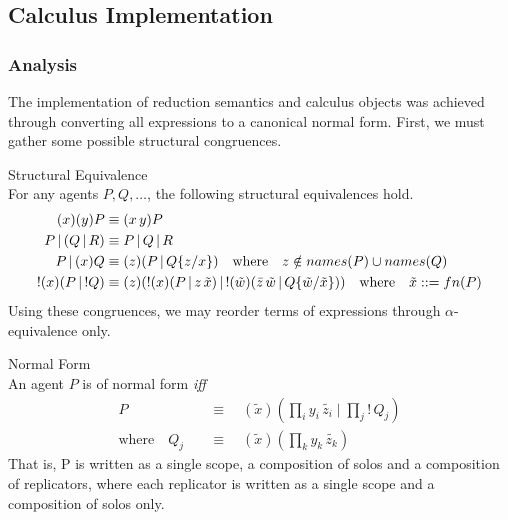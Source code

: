 \subsection{Calculus Implementation}\label{ssec:calculus-implementation}
    
    \subsubsection{Analysis}\label{sssec:calculus-analysis}
        The implementation of reduction semantics and calculus objects was achieved through converting all expressions to a canonical normal form.
        First, we must gather some possible structural congruences.

        \begin{lemma}{Structural Equivalence\\}
            For any agents $P, Q, \ldots$, the following structural equivalences hold.
            \begin{align*}
                (x)(y) P                & \equiv (x \, y) P \\
                P \, | \, (Q \, | \, R) & \equiv P \, | \, Q \, | \, R \\
                P \, | \, (x) Q         & \equiv (z)(P \, | \, Q\{z / x\}) \quad \text{where} \quad z \notin names(P) \cup names(Q) \\
                !(x)(P \, | \, !Q)      & \equiv (z)(!(x)(P \, | \, z \, \tilde{x}) \, | \, !(\tilde{w})(\bar{z} \, \tilde{w} \, | \, Q\{\tilde{w}/\tilde{x}\})) \quad \text{where} \quad \tilde{x} ::= fn(P)
            \end{align*}
            Using these congruences, we may reorder terms of expressions through $\alpha$-equivalence only.
        \end{lemma}

        \begin{definition}{Normal Form\\}
            An agent $P$ is of normal form \textit{iff}
            \begin{align*}
                                    P \quad &\equiv \quad (\tilde{x})(\prod_{i}{y_i \, \tilde{z_i}} \; | \; \prod_{j}{! \, Q_j}) \\
                \text{where} \quad Q_j \quad &\equiv \quad (\tilde{x})(\prod_{k}{y_k \, \tilde{z_k}})
            \end{align*}
            That is, P is written as a single scope, a composition of solos and a composition of replicators, where each replicator is written as a single scope and a composition of solos only.
        \end{definition}

